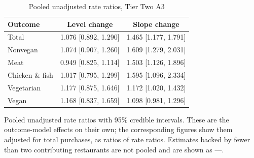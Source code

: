 \begin{table}[H]
\centering
\caption{Pooled unadjusted rate ratios, Tier Two A3}
\label{tab:rr_t2_a3}
\begin{tabular}{lcc}
\toprule
Outcome & Level change & Slope change \\
\midrule
Total & 1.076 [0.892, 1.290] & 1.465 [1.177, 1.791] \\
Nonvegan & 1.074 [0.907, 1.260] & 1.609 [1.279, 2.031] \\
Meat & 0.949 [0.825, 1.114] & 1.503 [1.126, 1.896] \\
Chicken \& fish & 1.017 [0.795, 1.299] & 1.595 [1.096, 2.334] \\
Vegetarian & 1.177 [0.875, 1.646] & 1.172 [1.020, 1.432] \\
Vegan & 1.168 [0.837, 1.659] & 1.098 [0.981, 1.296] \\
\bottomrule
\end{tabular}
\par\smallskip\footnotesize Pooled unadjusted rate ratios with 95\% credible intervals. These are the outcome-model effects on their own; the corresponding figures show them adjusted for total purchases, as ratios of rate ratios. Estimates backed by fewer than two contributing restaurants are not pooled and are shown as ---.
\end{table}

